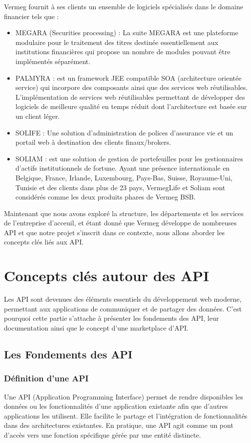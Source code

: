     Vermeg fournit à ses clients un ensemble de logiciels spécialisés dans le domaine financier tels que :
    \begin{itemize}
        \item MEGARA (Securities processing) : La suite MEGARA est une plateforme modulaire pour le traitement des titres destinée essentiellement aux institutions financières qui propose un nombre de modules pouvant être implémentés séparément.
        \item PALMYRA : est un framework JEE compatible SOA (architecture orientée service) qui incorpore des composants ainsi que des services web réutilisables. L’implémentation de services web réutilisables permettant de développer des logiciels de meilleure qualité en temps réduit dont l’architecture est basée sur un client léger.
        \item SOLIFE : Une solution d’administration de polices d’assurance vie et un portail web à destination des clients finaux/brokers.
        \item SOLIAM : est une solution de gestion de portefeuilles pour les gestionnaires d’actifs institutionnels de fortune. Ayant une présence internationale en Belgique, France, Irlande, Luxembourg, Pays-Bas, Suisse, Royaume-Uni, Tunisie et des clients dans plus de 23 pays, VermegLife et Soliam sont considérés comme les deux produits phares de Vermeg BSB.
    \end{itemize} 
    
Maintenant que nous avons exploré la structure, les départements et les services de l'entreprise d'acceuil, et étant donné que Vermeg développe de nombreuses API et que notre projet s'inscrit dans ce contexte, nous allons aborder les concepts clés liés aux API.   

\section{Concepts clés autour des API}
Les API sont devenues des éléments essentiels du développement web moderne, permettant aux applications de communiquer et de partager des données. C’est pourquoi cette partie s'attache à présenter les fondements des API, leur documentation ainsi que le concept d'une marketplace d'API.
\subsection{Les Fondements des API }

    \subsubsection{Définition d'une API }
    Une API (Application Programming Interface) permet de rendre disponibles les données ou les fonctionnalités d’une application existante afin que d’autres applications les utilisent. Elle facilite le partage et l’intégration de fonctionnalités dans des architectures existantes. En pratique, une API agit comme un pont d'accès vers une fonction spécifique gérée par une entité distincte. \cite[]{DefAPI}
\pagebreak  
